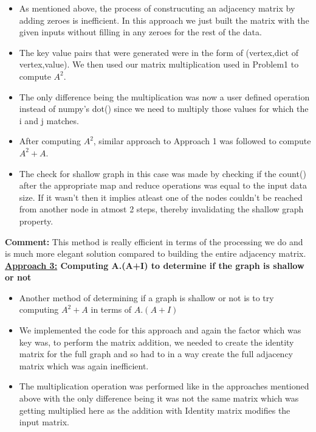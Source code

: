 \documentclass[11pt]{article}
\begin{document}
\begin{itemize}
\begin{itemize}
	\item As mentioned above, the process of construcuting an adjacency matrix by adding zeroes is inefficient. In this approach we just built the matrix with the given inputs without filling in any zeroes for the rest of the data.
 \item The key value pairs that were generated were in the form of (vertex,{dict of vertex,value}). We then used our matrix multiplication used in Problem1 to compute $A^2$. 
 \item The only difference being the multiplication was now a user defined operation instead of numpy's dot() since we need to multiply those values for which the i and j matches.
 \item After computing $A^2$, similar approach to Approach 1 was followed to compute $A^2+A$.
 \item The check for shallow graph in this case was made by checking if the count() after the appropriate map and reduce operations was equal to the input data size. If it wasn't then it implies atleast one of the nodes couldn't be reached from another node in atmost 2 steps, thereby invalidating the shallow graph property.
\end{itemize}

\textbf{Comment:} This method is really efficient in terms of the processing we do and is much more elegant solution compared to building the entire adjacency matrix.\\

\textbf{\underline{Approach 3:} Computing A.(A+I) to determine if the graph is shallow or not}

\begin{itemize}
	\item Another method of determining if a graph is shallow or not is to try computing $A^2 +A$ in terms of $A.(A+I)$
	\item We implemented the code for this approach and again the factor which was key was, to perform the matrix addition, we needed to create the identity matrix for the full graph and so had to in a way create the full adjacency matrix which was again inefficient.
	\item The multiplication operation was performed like in the approaches mentioned above with the only difference being it was not the same matrix which was getting multiplied here as the addition with Identity matrix modifies the input matrix.
\end{itemize}


\end{itemize}
\end{document}
